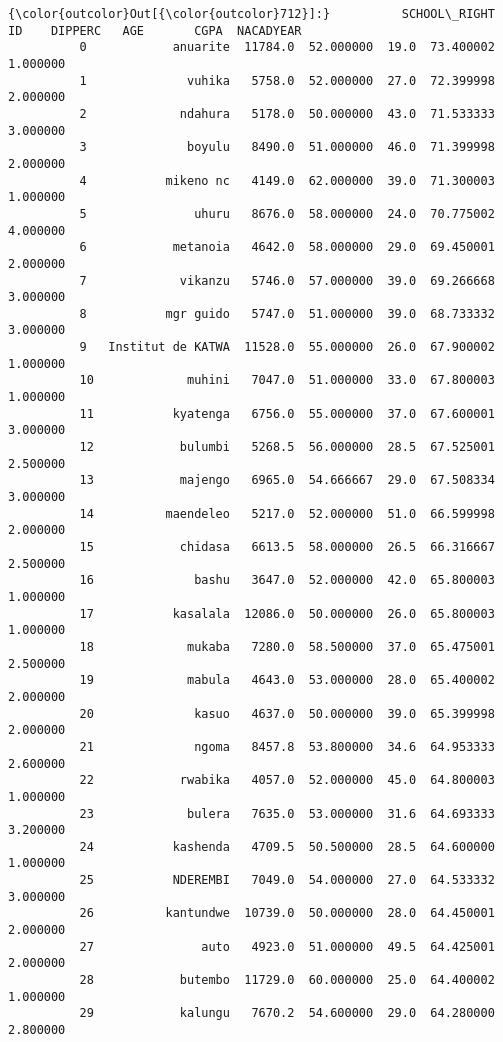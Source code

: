 \documentclass[11pt]{article}
\begin{document}
            \begin{Verbatim}[commandchars=\\\{\}]
{\color{outcolor}Out[{\color{outcolor}712}]:}          SCHOOL\_RIGHT       ID    DIPPERC   AGE       CGPA  NACADYEAR
          0            anuarite  11784.0  52.000000  19.0  73.400002   1.000000
          1              vuhika   5758.0  52.000000  27.0  72.399998   2.000000
          2             ndahura   5178.0  50.000000  43.0  71.533333   3.000000
          3              boyulu   8490.0  51.000000  46.0  71.399998   2.000000
          4           mikeno nc   4149.0  62.000000  39.0  71.300003   1.000000
          5               uhuru   8676.0  58.000000  24.0  70.775002   4.000000
          6            metanoia   4642.0  58.000000  29.0  69.450001   2.000000
          7             vikanzu   5746.0  57.000000  39.0  69.266668   3.000000
          8           mgr guido   5747.0  51.000000  39.0  68.733332   3.000000
          9   Institut de KATWA  11528.0  55.000000  26.0  67.900002   1.000000
          10             muhini   7047.0  51.000000  33.0  67.800003   1.000000
          11           kyatenga   6756.0  55.000000  37.0  67.600001   3.000000
          12            bulumbi   5268.5  56.000000  28.5  67.525001   2.500000
          13            majengo   6965.0  54.666667  29.0  67.508334   3.000000
          14          maendeleo   5217.0  52.000000  51.0  66.599998   2.000000
          15            chidasa   6613.5  58.000000  26.5  66.316667   2.500000
          16              bashu   3647.0  52.000000  42.0  65.800003   1.000000
          17           kasalala  12086.0  50.000000  26.0  65.800003   1.000000
          18             mukaba   7280.0  58.500000  37.0  65.475001   2.500000
          19             mabula   4643.0  53.000000  28.0  65.400002   2.000000
          20              kasuo   4637.0  50.000000  39.0  65.399998   2.000000
          21              ngoma   8457.8  53.800000  34.6  64.953333   2.600000
          22            rwabika   4057.0  52.000000  45.0  64.800003   1.000000
          23             bulera   7635.0  53.000000  31.6  64.693333   3.200000
          24           kashenda   4709.5  50.500000  28.5  64.600000   1.000000
          25           NDEREMBI   7049.0  54.000000  27.0  64.533332   3.000000
          26          kantundwe  10739.0  50.000000  28.0  64.450001   2.000000
          27               auto   4923.0  51.000000  49.5  64.425001   2.000000
          28            butembo  11729.0  60.000000  25.0  64.400002   1.000000
          29            kalungu   7670.2  54.600000  29.0  64.280000   2.800000

\end{Verbatim}
\end{document}

